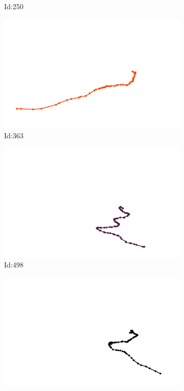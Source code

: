 \documentclass[12pt,twoside]{report}
\begin{document}
\begin{figure}
\begin{subfigure}[b]{0.20\textwidth}
\caption{Id:250}
\end{subfigure}
\begin{subfigure}[b]{0.20\textwidth}
\centering
\includegraphics[width=\textwidth]{../../trajectories/363.png}
\caption{Id:363}
\end{subfigure}
\begin{subfigure}[b]{0.20\textwidth}
\centering
\includegraphics[width=\textwidth]{../../trajectories/498.png}
\caption{Id:498}
\end{subfigure}
\begin{subfigure}[b]{0.20\textwidth}
\centering
\includegraphics[width=\textwidth]{../../trajectories/598.png}

\end{subfigure}
\end{figure}
\end{document}
